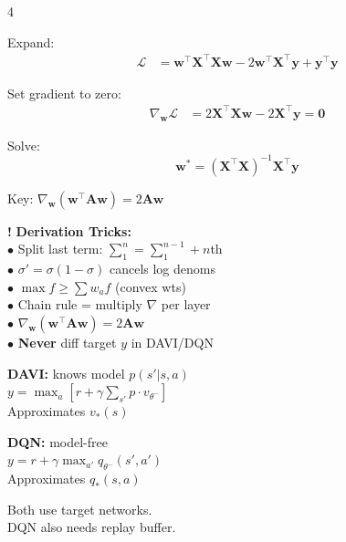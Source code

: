 \documentclass[6pt]{article}
\newcommand{\conceptbox}[2]{%
\begin{tcolorbox}[colback=atlantic!5, colframe=atlantic, title={\scriptsize\bfseries\color{white}#1}, coltitle=white, colbacktitle=atlantic, toptitle=1pt, bottomtitle=1pt]
#2
\end{tcolorbox}
}
\newcommand{\warnbox}[1]{%
\begin{tcolorbox}[colback=rose!8, colframe=rose, boxrule=0.8pt]
\textcolor{rose}{\textbf{!}} #1
\end{tcolorbox}
}
\begin{document}
\begin{multicols}{4}
{Expand:
\begin{align*}
\mathcal{L} &= \mathbf{w}^\top\mathbf{X}^\top\mathbf{X}\mathbf{w} - 2\mathbf{w}^\top\mathbf{X}^\top\mathbf{y} + \mathbf{y}^\top\mathbf{y}
\end{align*}

Set gradient to zero:
\begin{align*}
\nabla_\mathbf{w}\mathcal{L} &= 2\mathbf{X}^\top\mathbf{X}\mathbf{w} - 2\mathbf{X}^\top\mathbf{y} = \mathbf{0}
\end{align*}

Solve:
\[\boxed{\mathbf{w}^* = (\mathbf{X}^\top\mathbf{X})^{-1}\mathbf{X}^\top\mathbf{y}}\]

Key: $\nabla_\mathbf{w}(\mathbf{w}^\top\!\mathbf{A}\mathbf{w}) = 2\mathbf{A}\mathbf{w}$
}

\vspace{4pt}

\warnbox{\textbf{Derivation Tricks:}\\[1pt]
$\bullet$ Split last term: $\sum_1^n = \sum_1^{n-1} + n$th\\
$\bullet$ $\sigma'\!=\!\sigma(1\!-\!\sigma)$ cancels log denoms\\
$\bullet$ $\max f \geq \sum w_a f$ (convex wts)\\
$\bullet$ Chain rule = multiply $\nabla$ per layer\\
$\bullet$ $\nabla_\mathbf{w}(\mathbf{w}^\top\!\mathbf{A}\mathbf{w}) = 2\mathbf{A}\mathbf{w}$\\
$\bullet$ \textbf{Never} diff target $y$ in DAVI/DQN
}

\vspace{4pt}

\conceptbox{DAVI vs DQN}{
\textbf{DAVI:} knows model $p(s'|s,a)$\\
$y = \max_a[r + \gamma\sum_{s'}p\cdot v_{\theta^-}]$\\
Approximates $v_*(s)$

\vspace{2pt}
\textbf{DQN:} model-free\\
$y = r + \gamma\max_{a'}q_{\theta^-}(s',a')$\\
Approximates $q_*(s,a)$

\vspace{2pt}
Both use target networks.\\
DQN also needs replay buffer.
}

\end{multicols}
\end{document}
